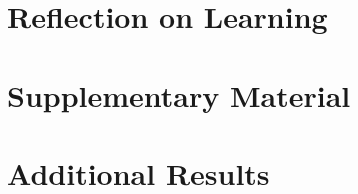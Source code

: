 \chapter{Reflection on Learning}\label{ch6}


\backmatter

\appendix
\chapter{Supplementary Material}\label{app:supp}


\chapter{Additional Results}\label{app:results}




